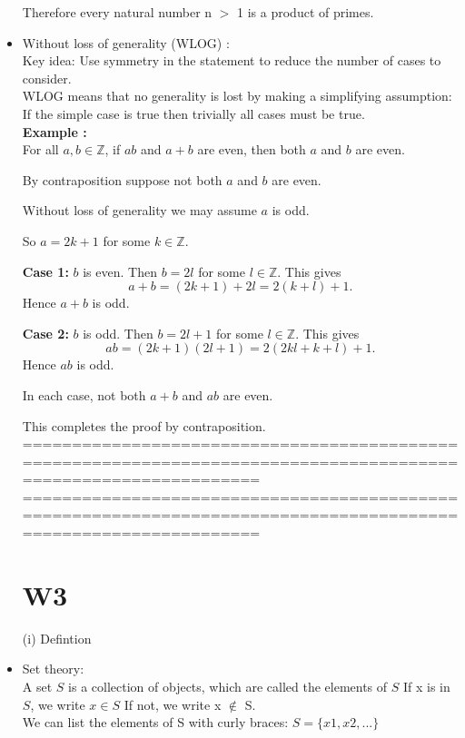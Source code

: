\documentclass{article}
\begin{document}
\begin{itemize}
Therefore every natural number n $>$ 1 is a product of primes.


\item Without loss of generality (WLOG) : \\
Key idea: Use symmetry in the statement to reduce the number of cases
to consider.\\
WLOG means that no generality is lost by making a simplifying
assumption: If the simple case is true then trivially all cases must be true.\\

\textbf{Example : }\\

For all \(a, b \in \mathbb{Z}\), if \(ab\) and \(a + b\) are even, then both \(a\) and \(b\) are even.

By contraposition suppose not both \(a\) and \(b\) are even.

Without loss of generality we may assume \(a\) is odd.

So \(a = 2k + 1\) for some \(k \in \mathbb{Z}\).

\textbf{Case 1:} \(b\) is even. Then \(b = 2l\) for some \(l \in \mathbb{Z}\). This gives
\[ a + b = (2k + 1) + 2l = 2(k + l) + 1. \]
Hence \(a + b\) is odd.

\textbf{Case 2:} \(b\) is odd. Then \(b = 2l + 1\) for some \(l \in \mathbb{Z}\). This gives
\[ ab = (2k + 1)(2l + 1) = 2(2kl + k + l) + 1. \]
Hence \(ab\) is odd.

In each case, not both \(a + b\) and \(ab\) are even.

This completes the proof by contraposition.\\

================================================================================================================
\newpage
================================================================================================================
\section{W3}
(i) Defintion\\
\item Set theory:\\
A set $S$ is a collection of objects, which are called the elements of $S$
If x is in $S$, we write $x \in S$
If not, we write x $\notin$ S.\\
We can list the elements of S with curly braces: $S = \{x1, x2,...\}$\\


\end{itemize}
\end{document}
